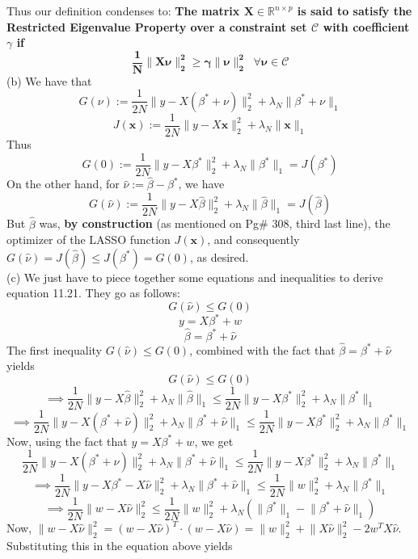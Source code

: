\documentclass[a4paper,11pt]{article}
\numberwithin{definition}{section}
\numberwithin{mytheorem}{subsection}
\begin{document}
Thus our definition condenses to:
\textbf{The matrix $\boldsymbol{X}\in\mathbb{R}^{n\times p}$ is said to satisfy the Restricted Eigenvalue Property over a constraint set $\mathcal{C}$ with coefficient $\gamma$ if }
$$\boldsymbol{\frac{1}{N}\lVert X\nu\rVert^2_2 \geq \gamma\lVert\nu\rVert_2^2\;\;\forall\nu\in\mathcal{C}}$$
(b) We have that 
$$G(\nu) := \frac{1}{2N}\lVert y - X(\beta^{*} + \nu)\rVert^2_2 + \lambda_N\lVert\beta^{*} + \nu\rVert_1$$
$$J(\boldsymbol{x}) := \frac{1}{2N}\lVert y - X\boldsymbol{x}\rVert^2_2 + \lambda_N\lVert\boldsymbol{x}\rVert_1$$
Thus 
$$G(0) := \frac{1}{2N}\lVert y - X\beta^{*}\rVert^2_2 + \lambda_N\lVert\beta^{*}\rVert_1 = J(\beta^{*})$$
On the other hand, for $\widehat{\nu} := \widehat{\beta} - \beta^{*}$, we have
$$G(\widehat{\nu}) := \frac{1}{2N}\lVert y - X\widehat{\beta}\rVert^2_2 + \lambda_N\lVert\widehat{\beta}\rVert_1 = J(\widehat{\beta})$$
But $\widehat{\beta}$ was, \textbf{by construction} (as mentioned on Pg\# 308, third last line), the optimizer of the LASSO function $J(\boldsymbol{x})$, and consequently $G(\widehat{\nu}) = J(\widehat{\beta}) \leq J(\beta^*) = G(0)$, as desired.\\
(c) We just have to piece together some equations and inequalities to derive equation 11.21. They go as follows:
$$G(\widehat{\nu}) \leq G(0)$$
$$y = X\beta^* + w$$
$$\widehat{\beta} = \beta^* + \widehat{\nu}$$
The first inequality $G(\widehat{\nu}) \leq G(0)$, combined with the fact that $\widehat{\beta} = \beta^* + \widehat{\nu}$ yields
$$G(\widehat{\nu}) \leq G(0)$$
$$\implies \frac{1}{2N}\lVert y - X\widehat{\beta}\rVert^2_2 + \lambda_N\lVert\widehat{\beta}\rVert_1 \leq \frac{1}{2N}\lVert y - X\beta^{*}\rVert^2_2 + \lambda_N\lVert\beta^{*}\rVert_1$$
$$\implies \frac{1}{2N}\lVert y - X(\beta^* + \widehat{\nu})\rVert^2_2 + \lambda_N\lVert\beta^* + \widehat{\nu}\rVert_1 \leq \frac{1}{2N}\lVert y - X\beta^{*}\rVert^2_2 + \lambda_N\lVert\beta^{*}\rVert_1$$
Now, using the fact that $y = X\beta^* + w$, we get
$$\frac{1}{2N}\lVert y - X(\beta^* + \widehat{\nu})\rVert^2_2 + \lambda_N\lVert\beta^* + \widehat{\nu}\rVert_1 \leq \frac{1}{2N}\lVert y - X\beta^{*}\rVert^2_2 + \lambda_N\lVert\beta^{*}\rVert_1$$
$$\implies \frac{1}{2N}\lVert y - X\beta^* - X\widehat{\nu}\rVert^2_2 + \lambda_N\lVert\beta^* + \widehat{\nu}\rVert_1 \leq \frac{1}{2N}\lVert w\rVert^2_2 + \lambda_N\lVert\beta^{*}\rVert_1$$
$$\implies \frac{1}{2N}\lVert w - X\widehat{\nu}\rVert^2_2 \leq \frac{1}{2N}\lVert w\rVert^2_2 + \lambda_N(\lVert\beta^{*}\rVert_1 - \lVert\beta^* + \widehat{\nu}\rVert_1)$$
Now, $\lVert w - X\widehat{\nu}\rVert^2_2 = (w - X\widehat{\nu})^T\cdot(w - X\widehat{\nu}) = \lVert w\rVert^2_2 + \lVert X\widehat{\nu}\rVert^2_2 - 2w^TX\widehat{\nu} $. Substituting this in the equation above yields
\end{document}

